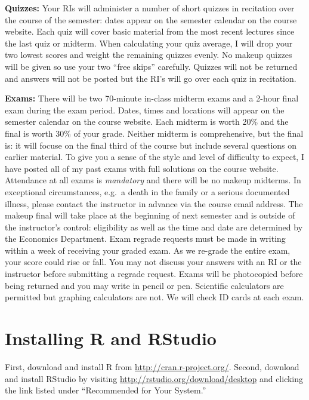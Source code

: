 \documentclass[11pt, letterpaper]{article}
\begin{document}
\medskip

\noindent \textbf{Quizzes:} 
Your RIs will administer a number of short quizzes in recitation over the course of the semester: dates appear on the semester calendar on the course website.
Each quiz will cover basic material from the most recent lectures since the last quiz or midterm. 
When calculating your quiz average, I will drop your two lowest scores and weight the remaining quizzes evenly. 
No makeup quizzes will be given so use your two ``free skips'' carefully.
Quizzes will not be returned and answers will not be posted but the RI's will go over each quiz in recitation.

\medskip

\noindent \textbf{Exams:} 
There will be two 70-minute in-class midterm exams and a 2-hour final exam during the exam period.
Dates, times and locations will appear on the semester calendar on the course website.
Each midterm is worth 20\% and the final is worth 30\% of your grade.
Neither midterm is comprehensive, but the final is: it will focuse on the final third of the course but include several questions on earlier material.
To give you a sense of the style and level of difficulty to expect, I have posted all of my past exams with full solutions on the course website.
Attendance at all exams is \emph{mandatory} and there will be no makeup midterms.
In exceptional circumstances, e.g.\ a death in the family or a serious documented illness, please contact the instructor in advance via the course email address.
The makeup final will take place at the beginning of next semester and is outside of the instructor's control: eligibility as well as the time and date are determined by the Economics Department. 
Exam regrade requests must be made in writing within a week of receiving your graded exam. 
As we re-grade the entire exam, your score could rise or fall. 
You may not discuss your answers with an RI or the instructor before submitting a regrade request. 
Exams will be photocopied before being returned and you may write in pencil or pen. 
Scientific calculators are permitted but graphing calculators are not. 
We will check ID cards at each exam.

\medskip



            
\section*{Installing R and RStudio} First, download and install R from \url{http://cran.r-project.org/}. Second, download and install RStudio by visiting \url{http://rstudio.org/download/desktop} and clicking the link listed under ``Recommended for Your System.'' 
\end{document}
